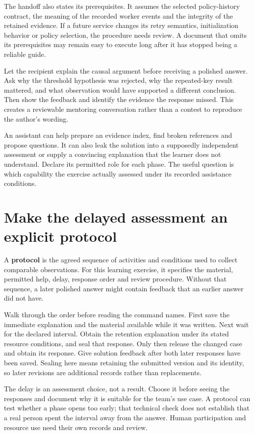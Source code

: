 The handoff also states its prerequisites. It assumes the selected policy-history contract, the meaning of the recorded worker events and the integrity of the retained evidence. If a future service changes its retry semantics, initialization behavior or policy selection, the procedure needs review. A document that omits its prerequisites may remain easy to execute long after it has stopped being a reliable guide.

Let the recipient explain the causal argument before receiving a polished answer. Ask why the threshold hypothesis was rejected, why the repeated-key result mattered, and what observation would have supported a different conclusion. Then show the feedback and identify the evidence the response missed. This creates a reviewable mentoring conversation rather than a contest to reproduce the author's wording.

An assistant can help prepare an evidence index, find broken references and propose questions. It can also leak the solution into a supposedly independent assessment or supply a convincing explanation that the learner does not understand. Declare its permitted role for each phase. The useful question is which capability the exercise actually assessed under its recorded assistance conditions.

\section{Make the delayed assessment an explicit protocol}\label{sec:ch13-delay}

A \textbf{protocol} is the agreed sequence of activities and conditions used to collect comparable observations. For this learning exercise, it specifies the material, permitted help, delay, response order and review procedure. Without that sequence, a later polished answer might contain feedback that an earlier answer did not have.

Walk through the order before reading the command names. First save the immediate explanation and the material available while it was written. Next wait for the declared interval. Obtain the retention explanation under its stated resource conditions, and seal that response. Only then release the changed case and obtain its response. Give solution feedback after both later responses have been saved. Sealing here means retaining the submitted version and its identity, so later revisions are additional records rather than replacements.

The delay is an assessment choice, not a result. Choose it before seeing the responses and document why it is suitable for the team's use case. A protocol can test whether a phase opens too early; that technical check does not establish that a real person spent the interval away from the answer. Human participation and resource use need their own records and review.

